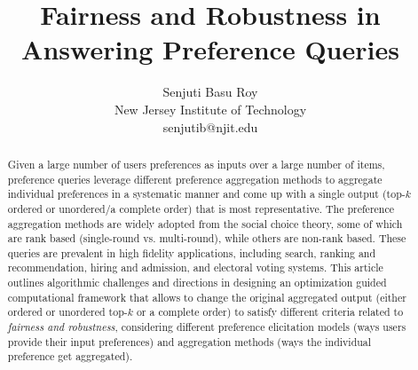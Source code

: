 \documentclass[11pt]{article}
\begin{document}
\title{Fairness and Robustness in Answering Preference Queries}

\author{
Senjuti Basu Roy\\
New Jersey Institute of Technology\\
senjutib@njit.edu}


\date{}

\maketitle
\begin{abstract}

Given a large number of users preferences as inputs over a large number of items, preference queries leverage different preference aggregation methods to aggregate individual preferences in a systematic manner and come up with a single output (top-$k$ ordered or unordered/a complete order) that is most representative. The preference aggregation methods are widely adopted from the social choice theory, some of which are rank based (single-round vs. multi-round), while others are non-rank based. These queries are prevalent in high fidelity applications, including search, ranking and recommendation,  hiring and admission, and electoral voting systems. This article outlines algorithmic challenges and directions in designing an optimization guided computational framework that allows to change the original  aggregated output (either ordered or unordered top-$k$ or a complete order) to satisfy different criteria related to {\em fairness and robustness}, considering different preference elicitation models (ways users provide their input preferences) and aggregation methods (ways the individual preference get aggregated). 


\end{abstract}


\vspace{-0.1in}
\end{document}
